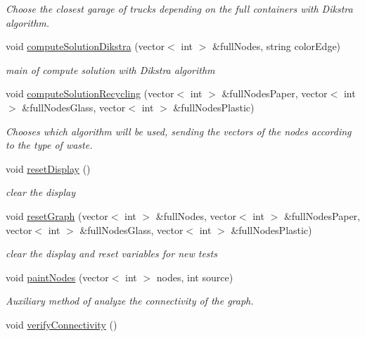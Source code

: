 \begin{DoxyCompactItemize}
\begin{DoxyCompactList}\small\item\em Choose the closest garage of trucks depending on the full containers with Dikstra algorithm. \end{DoxyCompactList}\item 
void \hyperlink{classSmartWaste_ac97fb07911f6728e6d8593daa5699188}{compute\+Solution\+Dikstra} (vector$<$ int $>$ \&full\+Nodes, string color\+Edge)
\begin{DoxyCompactList}\small\item\em main of compute solution with Dikstra algorithm \end{DoxyCompactList}\item 
void \hyperlink{classSmartWaste_a633d96a03ef0aa2252d6f5fb104af863}{compute\+Solution\+Recycling} (vector$<$ int $>$ \&full\+Nodes\+Paper, vector$<$ int $>$ \&full\+Nodes\+Glass, vector$<$ int $>$ \&full\+Nodes\+Plastic)
\begin{DoxyCompactList}\small\item\em Chooses which algorithm will be used, sending the vectors of the nodes according to the type of waste. \end{DoxyCompactList}\item 
void \hyperlink{classSmartWaste_a9d2f0d30f5162dca774e5138b71d5130}{reset\+Display} ()
\begin{DoxyCompactList}\small\item\em clear the display \end{DoxyCompactList}\item 
void \hyperlink{classSmartWaste_a4b2e5cf812f4fcb7ffffabbd507f4e2e}{reset\+Graph} (vector$<$ int $>$ \&full\+Nodes, vector$<$ int $>$ \&full\+Nodes\+Paper, vector$<$ int $>$ \&full\+Nodes\+Glass, vector$<$ int $>$ \&full\+Nodes\+Plastic)
\begin{DoxyCompactList}\small\item\em clear the display and reset variables for new tests \end{DoxyCompactList}\item 
void \hyperlink{classSmartWaste_ad13fe762051a627f7c91e18b56b5871c}{paint\+Nodes} (vector$<$ int $>$ nodes, int source)
\begin{DoxyCompactList}\small\item\em Auxiliary method of analyze the connectivity of the graph. \end{DoxyCompactList}\item 
void \hyperlink{classSmartWaste_adc740c52afb954d4781555c2a24b095f}{verify\+Connectivity} ()

\end{DoxyCompactItemize}
